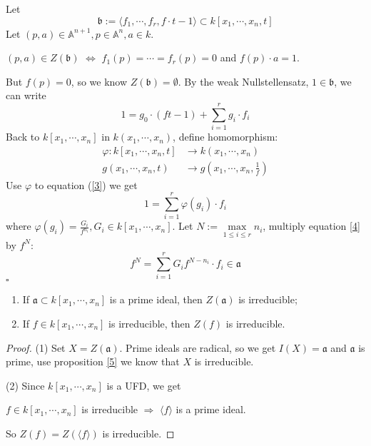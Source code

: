 	Let
	\begin{equation}
		\mathfrak{b}:=\langle f_1,\cdots,f_r,f\cdot t -1\rangle\subset k[x_1,\cdots,x_n,t]
	\end{equation}
	Let $ (p,a)\in \mathbb{A}^{n+1}, p\in \mathbb{A}^n, a\in k $.
	\begin{center}
		$ (p,a)\in Z(\mathfrak{b}) $ $ \Leftrightarrow $ $ f_1(p)=\cdots=f_r(p)=0 $ and $ f(p)\cdot a=1 $.
	\end{center}
	But $ f(p)=0 $, so we know $ Z(\mathfrak{b})=\emptyset $. By the weak Nullstellensatz, $ 1\in \mathfrak{b} $, we can write
	\begin{equation}
		1=g_0\cdot (ft-1)+\sum\limits_{i=1}^{r}g_i\cdot f_i\label{3}
	\end{equation}
	Back to $ k[x_1,\cdots,x_n] $ in $ k(x_1,\cdots,x_n) $, define homomorphism:
	$$
		\begin{array}{cc}
			\varphi: k[x_1,\cdots,x_n,t] & \to k(x_1,\cdots,x_n)             \\
			g(x_1,\cdots,x_n,t)          & \to g(x_1,\cdots,x_n,\frac{1}{f})
		\end{array}
	$$
	Use $ \varphi $ to equation (\ref{3}) we get
	\begin{equation}
		1=\sum\limits_{i=1}^{r}\varphi (g_i)\cdot f_i\label{4}
	\end{equation}
	where $ \varphi(g_i)=\frac{G_i}{f^{n_i}},G_i\in k[x_1,\cdots,x_n] $. Let $ N:=\max\limits_{1\leq i\leq r}n_i $, multiply equation \ref{4} by $ f^N $:
	\begin{equation}
		f^N=\sum\limits_{i=1}^{r}G_if^{N-n_i}\cdot f_i\in \mathfrak{a}
	\end{equation}
\hfill $\square$\par
\begin{corollary}{}
  \noindent
	\begin{enumerate}
		\item If $ \mathfrak{a}\subset k[x_1,\cdots,x_n] $ is a prime ideal, then $ Z(\mathfrak{a}) $ is irreducible;
		\item If $ f\in k[x_1,\cdots,x_n] $ is irreducible, then $ Z(f) $ is irreducible.
	\end{enumerate}
\end{corollary}
\begin{proof}
	(1) Set $ X=Z(\mathfrak{a}) $. Prime ideals are radical, so we get $ I(X)=\mathfrak{a} $ and $ \mathfrak{a} $ is prime, use proposition \ref{5} we know that $ X $ is irreducible.

	(2) Since $ k[x_1,\cdots,x_n] $ is a UFD, we get
	\begin{center}
		$ f\in k[x_1,\cdots,x_n] $ is irreducible $ \Rightarrow $ $ \langle f\rangle $ is a prime ideal.
	\end{center}
	So $ Z(f)=Z(\langle f\rangle) $ is irreducible.
\end{proof}

